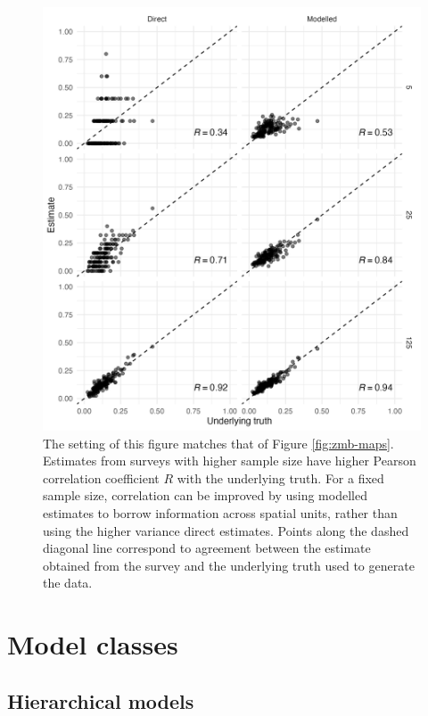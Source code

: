 \documentclass[a4paper, nobind]{templates/ociamthesis}
\begin{document}
\begin{figure}

{\centering \includegraphics[width=0.95\linewidth]{figures/bayesian/zmb-scatter} 

}

\caption{The setting of this figure matches that of Figure \ref{fig:zmb-maps}. Estimates from surveys with higher sample size have higher Pearson correlation coefficient \(R\) with the underlying truth. For a fixed sample size, correlation can be improved by using modelled estimates to borrow information across spatial units, rather than using the higher variance direct estimates. Points along the dashed diagonal line correspond to agreement between the estimate obtained from the survey and the underlying truth used to generate the data.}\label{fig:zmb-scatter}
\end{figure}

\hypertarget{hierarchical-lgm-elgm}{%
\section{Model classes}\label{hierarchical-lgm-elgm}}

\hypertarget{hierarchical}{%
\subsection{Hierarchical models}\label{hierarchical}}
\end{document}
